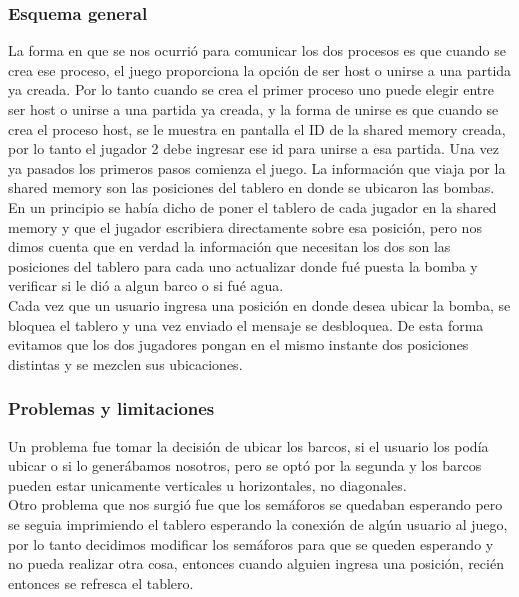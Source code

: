 \documentclass[10pt,a4paper]{article}
\begin{document}
	\subsubsection{Esquema general}
		La forma en que se nos ocurri\'o para comunicar los dos procesos es que cuando se crea ese proceso, el juego proporciona la opci\'on de ser host o unirse a una partida ya creada. Por lo tanto cuando se crea el primer proceso uno puede elegir entre ser host o unirse a una partida ya creada, y la forma de unirse es que cuando se crea el proceso host, se le muestra en pantalla el ID de la shared memory creada, por lo tanto el jugador 2 debe ingresar ese id para unirse a esa partida. Una vez ya pasados los primeros pasos comienza el juego. La informaci\'on que viaja por la shared memory son las posiciones del tablero en donde se ubicaron las bombas. En un principio se hab\'ia dicho de poner el tablero de cada jugador en la shared memory y que el jugador escribiera directamente sobre esa posici\'on, pero nos dimos cuenta que en verdad la informaci\'on que necesitan los dos son las posiciones del tablero para cada uno actualizar donde fu\'e puesta la bomba y verificar si le di\'o a algun barco o si fu\'e agua. \\
		Cada vez que un usuario ingresa una posici\'on en donde desea ubicar la bomba, se bloquea el tablero y una vez enviado el mensaje se desbloquea. De esta forma evitamos que los dos jugadores pongan en el mismo instante dos posiciones distintas y se mezclen sus ubicaciones.
	\subsubsection{Problemas y limitaciones}
		Un problema fue tomar la decisi\'on de ubicar los barcos, si el usuario los pod\'ia ubicar o si lo gener\'abamos nosotros, pero se opt\'o por la segunda y los barcos pueden estar unicamente verticales u horizontales, no diagonales. \\
		Otro problema que nos surgi\'o fue que los sem\'aforos se quedaban esperando pero se seguia imprimiendo el tablero esperando la conexi\'on de alg\'un usuario al juego, por lo tanto decidimos modificar los sem\'aforos para que se queden esperando y no pueda realizar otra cosa, entonces cuando alguien ingresa una posici\'on, reci\'en entonces se refresca el tablero.  
\newpage
\end{document}
